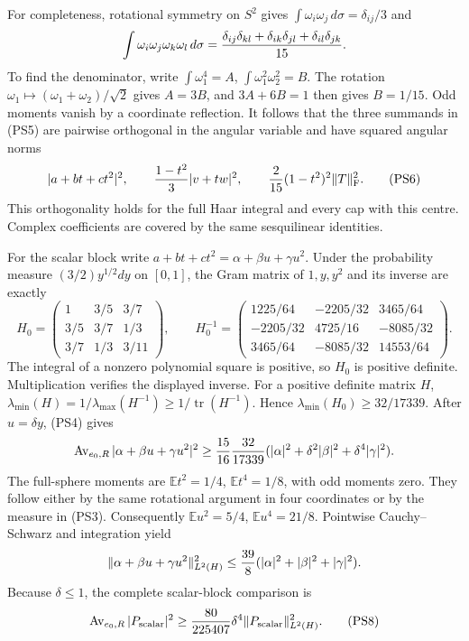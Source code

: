 \documentclass[11pt]{article}
\begin{document}
For completeness, rotational symmetry on \(S^2\) gives
\(\int\omega_i\omega_j\,d\sigma=\delta_{ij}/3\) and
\[
 \int\omega_i\omega_j\omega_k\omega_l\,d\sigma
 ={\delta_{ij}\delta_{kl}+\delta_{ik}\delta_{jl}
                         +\delta_{il}\delta_{jk}\over15}.
\]
To find the denominator, write
\(\int\omega_1^4=A\), \(\int\omega_1^2\omega_2^2=B\).
The rotation \(\omega_1\mapsto(\omega_1+\omega_2)/\sqrt2\)
gives \(A=3B\), and \(3A+6B=1\) then gives \(B=1/15\).
Odd moments vanish by a coordinate reflection. It follows that the
three summands in (PS5) are pairwise orthogonal in the angular
variable and have squared angular norms
\[
 |a+bt+ct^2|^2,\qquad
 {1-t^2\over3}|v+tw|^2,\qquad
 {2\over15}(1-t^2)^2\|T\|_{\mathrm F}^2.
 \tag{PS6}
\]
This orthogonality holds for the full Haar integral and every cap
with this centre. Complex coefficients are covered by the same
sesquilinear identities.

For the scalar block write \(a+bt+ct^2=\alpha+\beta u+\gamma u^2\).
Under the probability measure \((3/2)y^{1/2}dy\) on \([0,1]\),
the Gram matrix of \(1,y,y^2\) and its inverse are exactly
\[
 H_0=
 \begin{pmatrix}
 1&3/5&3/7\\3/5&3/7&1/3\\3/7&1/3&3/11
 \end{pmatrix},\qquad
 H_0^{-1}=
 \begin{pmatrix}
 1225/64&-2205/32&3465/64\\
 -2205/32&4725/16&-8085/32\\
 3465/64&-8085/32&14553/64
 \end{pmatrix}.
 \tag{PS7}
\]
The integral of a nonzero polynomial square is positive, so \(H_0\)
is positive definite. Multiplication verifies the displayed inverse.
For a positive definite matrix \(H\),
\(\lambda_{\min}(H)=1/\lambda_{\max}(H^{-1})
\ge1/\operatorname{tr}(H^{-1})\). Hence
\(\lambda_{\min}(H_0)\ge32/17339\).
After \(u=\delta y\), (PS4) gives
\[
 \operatorname{Av}_{e_0,R}|\alpha+\beta u+\gamma u^2|^2
 \ge {15\over16}{32\over17339}
          (|\alpha|^2+\delta^2|\beta|^2+\delta^4|\gamma|^2).
\]
The full-sphere moments are
\(\mathbb Et^2=1/4\), \(\mathbb Et^4=1/8\), with odd moments zero.
They follow either by the same rotational argument in four
coordinates or by the measure in (PS3). Consequently
\(\mathbb Eu^2=5/4\), \(\mathbb Eu^4=21/8\). Pointwise
Cauchy–Schwarz and integration yield
\[
 \|\alpha+\beta u+\gamma u^2\|_{L^2(H)}^2
 \le {39\over8}(|\alpha|^2+|\beta|^2+|\gamma|^2).
\]
Because \(\delta\le1\), the complete scalar-block comparison is
\[
 \operatorname{Av}_{e_0,R}|P_{\rm scalar}|^2
 \ge {80\over225407}\delta^4\|P_{\rm scalar}\|_{L^2(H)}^2.
 \tag{PS8}
\]
\end{document}
